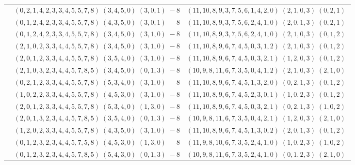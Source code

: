 \documentclass[11pt]{article}
\begin{document}
\begin{longtable}[l]{|c|c|c|}
 \cline{2-3} 
 & $(0 ,2 ,1 ,4 ,2 ,3 ,3 ,4 ,5 ,5 ,7 ,8) \;(3 ,4 ,5 ,0) \;(3 ,0 ,1) \;-8$ & $(11 ,10 ,8 ,9 ,3 ,7 ,5 ,6 ,1 ,4 ,2 ,0) \;(2 ,1 ,0 ,3) \;(0 ,2 ,1) \;$\\ 
 \cline{2-3} 
 & $(0 ,1 ,2 ,4 ,2 ,3 ,3 ,4 ,5 ,5 ,7 ,8) \;(4 ,3 ,5 ,0) \;(3 ,0 ,1) \;-8$ & $(11 ,10 ,8 ,9 ,3 ,7 ,5 ,6 ,2 ,4 ,1 ,0) \;(2 ,0 ,1 ,3) \;(0 ,2 ,1) \;$\\ 
 \cline{2-3} 
 & $(0 ,1 ,2 ,4 ,2 ,3 ,3 ,4 ,5 ,5 ,7 ,8) \;(3 ,4 ,5 ,0) \;(3 ,1 ,0) \;-8$ & $(11 ,10 ,8 ,9 ,3 ,7 ,5 ,6 ,2 ,4 ,1 ,0) \;(2 ,1 ,0 ,3) \;(0 ,1 ,2) \;$\\ 
 \cline{2-3} 
 & $(2 ,1 ,0 ,2 ,3 ,3 ,4 ,4 ,5 ,5 ,7 ,8) \;(3 ,4 ,5 ,0) \;(3 ,1 ,0) \;-8$ & $(11 ,10 ,8 ,9 ,6 ,7 ,4 ,5 ,0 ,3 ,1 ,2) \;(2 ,1 ,0 ,3) \;(0 ,1 ,2) \;$\\ 
 \cline{2-3} 
 & $(2 ,0 ,1 ,2 ,3 ,3 ,4 ,4 ,5 ,5 ,7 ,8) \;(3 ,5 ,4 ,0) \;(3 ,1 ,0) \;-8$ & $(11 ,10 ,8 ,9 ,6 ,7 ,4 ,5 ,0 ,3 ,2 ,1) \;(1 ,2 ,0 ,3) \;(0 ,1 ,2) \;$\\ 
 \cline{2-3} 
 & $(2 ,1 ,0 ,3 ,2 ,3 ,4 ,4 ,5 ,7 ,8 ,5) \;(3 ,4 ,5 ,0) \;(0 ,1 ,3) \;-8$ & $(10 ,9 ,8 ,11 ,6 ,7 ,3 ,5 ,0 ,4 ,1 ,2) \;(2 ,1 ,0 ,3) \;(2 ,1 ,0) \;$\\ 
 \cline{2-3} 
 & $(0 ,2 ,1 ,2 ,3 ,3 ,4 ,4 ,5 ,5 ,7 ,8) \;(5 ,3 ,4 ,0) \;(3 ,1 ,0) \;-8$ & $(11 ,10 ,8 ,9 ,6 ,7 ,4 ,5 ,1 ,3 ,2 ,0) \;(0 ,2 ,1 ,3) \;(0 ,1 ,2) \;$\\ 
 \cline{2-3} 
 & $(1 ,0 ,2 ,2 ,3 ,3 ,4 ,4 ,5 ,5 ,7 ,8) \;(4 ,5 ,3 ,0) \;(3 ,1 ,0) \;-8$ & $(11 ,10 ,8 ,9 ,6 ,7 ,4 ,5 ,2 ,3 ,0 ,1) \;(1 ,0 ,2 ,3) \;(0 ,1 ,2) \;$\\ 
 \cline{2-3} 
 & $(2 ,0 ,1 ,2 ,3 ,3 ,4 ,4 ,5 ,5 ,7 ,8) \;(5 ,3 ,4 ,0) \;(1 ,3 ,0) \;-8$ & $(11 ,10 ,8 ,9 ,6 ,7 ,4 ,5 ,0 ,3 ,2 ,1) \;(0 ,2 ,1 ,3) \;(1 ,0 ,2) \;$\\ 
 \cline{2-3} 
 & $(2 ,0 ,1 ,3 ,2 ,3 ,4 ,4 ,5 ,7 ,8 ,5) \;(3 ,5 ,4 ,0) \;(0 ,1 ,3) \;-8$ & $(10 ,9 ,8 ,11 ,6 ,7 ,3 ,5 ,0 ,4 ,2 ,1) \;(1 ,2 ,0 ,3) \;(2 ,1 ,0) \;$\\ 
 \cline{2-3} 
 & $(1 ,2 ,0 ,2 ,3 ,3 ,4 ,4 ,5 ,5 ,7 ,8) \;(4 ,3 ,5 ,0) \;(3 ,1 ,0) \;-8$ & $(11 ,10 ,8 ,9 ,6 ,7 ,4 ,5 ,1 ,3 ,0 ,2) \;(2 ,0 ,1 ,3) \;(0 ,1 ,2) \;$\\ 
 \cline{2-3} 
 & $(0 ,1 ,2 ,3 ,2 ,3 ,4 ,4 ,5 ,7 ,5 ,8) \;(4 ,5 ,3 ,0) \;(1 ,3 ,0) \;-8$ & $(11 ,9 ,8 ,10 ,6 ,7 ,3 ,5 ,2 ,4 ,1 ,0) \;(1 ,0 ,2 ,3) \;(1 ,0 ,2) \;$\\ 
 \cline{2-3} 
 & $(0 ,1 ,2 ,3 ,2 ,3 ,4 ,4 ,5 ,7 ,8 ,5) \;(5 ,4 ,3 ,0) \;(0 ,1 ,3) \;-8$ & $(10 ,9 ,8 ,11 ,6 ,7 ,3 ,5 ,2 ,4 ,1 ,0) \;(0 ,1 ,2 ,3) \;(2 ,1 ,0) \;$\\ 

\end{longtable}
\end{document}
